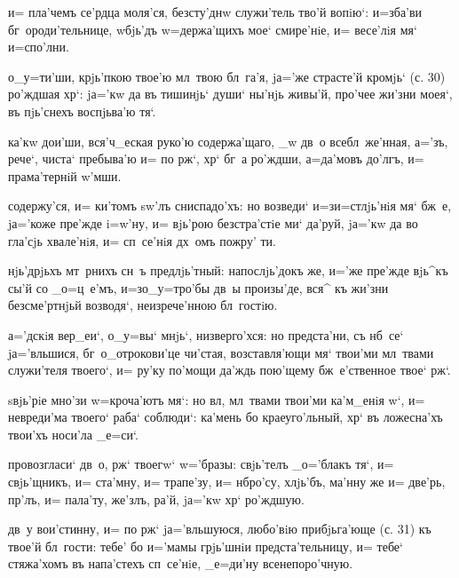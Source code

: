 и= пла'чемъ се'рдца моля'ся, безсту'днw служи'тель тво'й 
вопiю`: и=зба'ви бг~ороди'тельнице, w\т бjь'дъ 
w=держа'щихъ мое` смире'нiе, и= весе'лiя мя` и=спо'лни.

о_у=ти'ши, крjь'пкою твое'ю мл~твою бл~га'я, jа='же 
страсте'й кромjь` (с. 30) ро'ждшая хр`: jа='кw да въ 
тишинjь` души` ны'нjь живы'й, про'чее жи'зни моея`, въ 
пjь'снехъ воспjьва'ю тя`.

ка'кw дои'ши, вся'ч_еская руко'ю содержа'щаго, _w дв~о 
всебл~же'нная, а='зъ, рече`, чиста` пребыва'ю и= по 
рж`, хр` бг~а ро'ждши, а=да'мовъ до'лгъ, и= 
прама'тернiй w'мши.


содержу'ся, и= ки'томъ sw'лъ сниспадо'хъ: но возведи` 
и=з\ъ и=стлjь'нiя мя` бж~е, jа='коже пре'жде i=w'ну, и= 
вjь'рою безстра'стiе ми` да'руй, jа='кw да во гла'сjь 
хвале'нiя, и= сп~се'нiя дх~омъ пожру' ти.

нjь'дрjьхъ мт~рнихъ сн~ъ предлjь'тный: напослjь'докъ же, 
и='же пре'жде вjь^къ сы'й со _о=ц~е'мъ, и=з\ъ о_у=тро'бы 
дв~ы произы'де, вся^ къ жи'зни безсме'ртнjьй возводя`, 
неизрече'нною бл~гостiю.

а='дскiя вер_еи`, о_у=вы` мнjь`, низверго'хся: но 
предста'ни, съ нб~се` jа='вльшися, бг~о_отрокови'це 
чи'стая, возставля'ющи мя` твои'ми мл~твами служи'теля 
твоего`, и= ру'ку по'мощи да'ждь пою'щему бж~е'ственное 
твое` рж`.

sвjь'рiе мно'зи w=кроча'ютъ мя`: но вл, мл~твами 
твои'ми ка'м_енiя w`, и= невреди'ма твоего` раба` 
соблюди`: ка'мень бо краеуго'льный, хр` въ ложесна'хъ 
твои'хъ носи'ла _е=си`.

провозгласи` дв~о, рж` твоегw` w='бразы: свjь'телъ 
_о='блакъ тя`, и= свjь'щникъ, и= ста'мну, и= трапе'зу, и= 
нб ро'су, хлjь'бъ, ма'нну же и= две'рь, пр'лъ, 
и= пала'ту, же'злъ, ра'й, jа='кw хр` ро'ждшую.


дв~у вои'стинну, и= по рж` jа='вльшуюся, любо'вiю 
прибjьга'юще (с. 31) къ твое'й бл~гости: тебе' бо и='мамы 
грjь'шнiи предста'тельницу, и= тебе` стяжа'хомъ въ 
напа'стехъ сп~се'нiе, _е=ди'ну всенепоро'чную.

